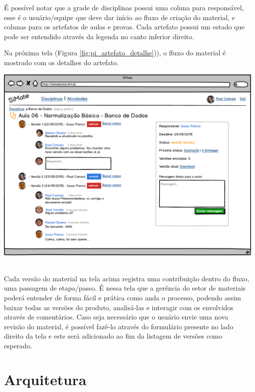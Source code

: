É possível notar que a grade de disciplinas possui uma coluna para responsável, esse é o usuário/equipe que deve dar início ao fluxo de criação do material, e colunas para os artefatos de aulas e provas. Cada artefato possui um estado que pode ser entendido através da legenda no canto inferior direito.

Na próxima tela (Figura \hyperref[fig:pi_artefato_detalhe]{\ref{fig:pi_artefato_detalhe}})), o fluxo do material é mostrado com os detalhes do artefato. 

\vspace{5mm}
\begin{minipage}[c]{\textwidth}
    \includegraphics[width=15cm]{Imagens/SiMateTelas/ArtefatoDetalhe.png}
	\label{fig:pi_artefato_detalhe}
\end{minipage} \\

Cada versão do material na tela acima registra uma contribuição dentro do fluxo, uma passagem de etapa/passo. É nessa tela que a gerência do setor de materiais poderá entender de forma fácil e prática como anda o processo, podendo assim baixar todas as versões do produto, analisá-las e interagir com os envolvidos através de comentários. Caso seja necessário que o usuário envie uma nova revisão do material, é possível fazê-lo através do formulário presente no lado direito da tela e este será adicionado ao fim da listagem de versões como esperado.

\section{Arquitetura}

